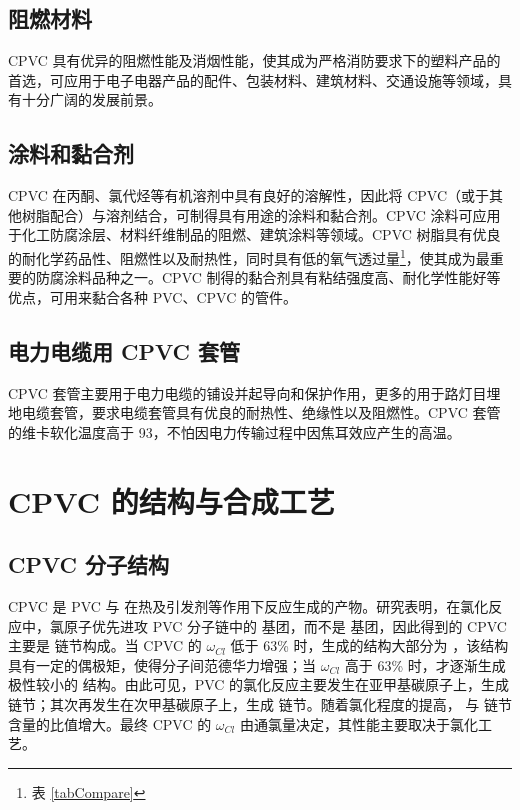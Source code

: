 \subsection{阻燃材料}
CPVC 具有优异的阻燃性能及消烟性能，使其成为严格消防要求下的塑料产品的首选，可应用于电子电器产品的配件、包装材料、建筑材料、交通设施等领域，具有十分广阔的发展前景。

\subsection{涂料和黏合剂}
CPVC 在丙酮、氯代烃等有机溶剂中具有良好的溶解性，因此将 CPVC（或于其他树脂配合）与溶剂结合，可制得具有用途的涂料和黏合剂。CPVC 涂料可应用于化工防腐涂层、材料纤维制品的阻燃、建筑涂料等领域。CPVC 树脂具有优良的耐化学药品性、阻燃性以及耐热性，同时具有低的氧气透过量\footnote{表 \ref{tabCompare}}，使其成为最重要的防腐涂料品种之一。CPVC 制得的黏合剂具有粘结强度高、耐化学性能好等优点，可用来黏合各种 PVC、CPVC 的管件。

\subsection{电力电缆用 CPVC 套管}
CPVC 套管主要用于电力电缆的铺设并起导向和保护作用，更多的用于路灯目埋地电缆套管，要求电缆套管具有优良的耐热性、绝缘性以及阻燃性。CPVC 套管的维卡软化温度高于 93\cd，不怕因电力传输过程中因焦耳效应产生的高温。


\section{CPVC 的结构与合成工艺}

\subsection{CPVC 分子结构}
\setatomsep{1.5em}
CPVC 是 PVC 与  在热及引发剂等作用下反应生成的产物。研究表明，在氯化反应中，氯原子优先进攻 PVC 分子链中的  基团，而不是  基团，因此得到的 CPVC 主要是   链节构成。当 CPVC 的 $\omega_{Cl}$ 低于 63\% 时，生成的结构大部分为  ，该结构具有一定的偶极矩，使得分子间范德华力增强；当 $\omega_{Cl}$ 高于 63\% 时，才逐渐生成极性较小的   结构。由此可见，PVC 的氯化反应主要发生在亚甲基碳原子上，生成   链节；其次再发生在次甲基碳原子上，生成   链节。随着氯化程度的提高，  与   链节含量的比值增大。最终 CPVC 的 $\omega_{Cl}$ 由通氯量决定，其性能主要取决于氯化工艺。
    
